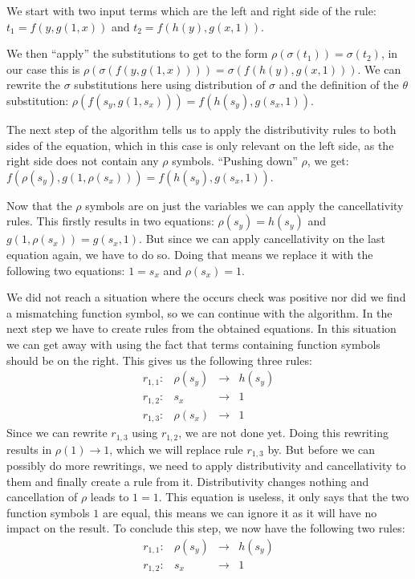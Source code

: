 We start with two input terms which are the left and right side of the rule: $t_1 = f(y, g(1, x))$ and $t_2 = f(h(y), g(x, 1))$.

We then ``apply'' the substitutions to get to the form $\rho(\sigma(t_1)) = \sigma(t_2)$, in our case this is $\rho(\sigma(f(y, g(1, x)))) = \sigma(f(h(y), g(x, 1)))$. We can rewrite the $\sigma$ substitutions here using distribution of $\sigma$ and the definition of the $\theta$ substitution: $\rho(f(s_y, g(1, s_x))) = f(h(s_y), g(s_x, 1))$.

The next step of the algorithm tells us to apply the distributivity rules to both sides of the equation, which in this case is only relevant on the left side, as the right side does not contain any $\rho$ symbols. ``Pushing down'' $\rho$, we get: $f(\rho(s_y), g(1, \rho(s_x))) = f(h(s_y), g(s_x, 1))$.

Now that the $\rho$ symbols are on just the variables we can apply the cancellativity rules. This firstly results in two equations: $\rho(s_y) = h(s_y)$ and $g(1, \rho(s_x)) = g(s_x, 1)$. But since we can apply cancellativity on the last equation again, we have to do so. Doing that means we replace it with the following two equations: $1 = s_x$ and $\rho(s_x) = 1$.

We did not reach a situation where the occurs check was positive nor did we find a mismatching function symbol, so we can continue with the algorithm. In the next step we have to create rules from the obtained equations. In this situation we can get away with using the fact that terms containing function symbols should be on the right. This gives us the following three rules:
$$
\begin{array}{lrcl}
    r_{1,1}: & \rho(s_y) & \rightarrow & h(s_y) \\
    r_{1,2}: & s_x & \rightarrow & 1 \\
    r_{1,3}: & \rho(s_x) & \rightarrow & 1
\end{array}
$$
Since we can rewrite $r_{1,3}$ using $r_{1,2}$, we are not done yet. Doing this rewriting results in $\rho(1) \rightarrow 1$, which we will replace rule $r_{1,3}$ by. But before we can possibly do more rewritings, we need to apply distributivity and cancellativity to them and finally create a rule from it. Distributivity changes nothing and cancellation of $\rho$ leads to $1 = 1$. This equation is useless, it only says that the two function symbols $1$ are equal, this means we can ignore it as it will have no impact on the result. To conclude this step, we now have the following two rules:
$$
\begin{array}{lrcl}
    r_{1,1}: & \rho(s_y) & \rightarrow & h(s_y) \\
    r_{1,2}: & s_x & \rightarrow & 1
\end{array}
$$

